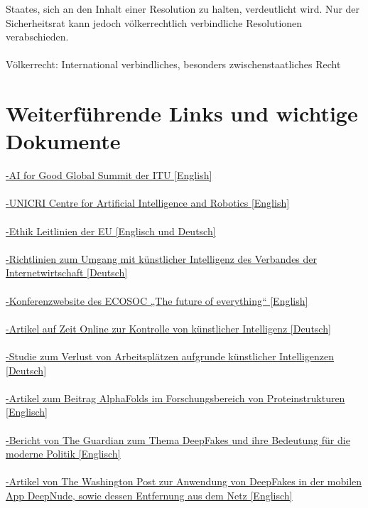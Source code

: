 \documentclass[a4paper,11pt]{article}
\begin{document}
Staates, sich an den Inhalt einer Resolution zu halten, verdeutlicht wird. Nur der Sicherheitsrat kann jedoch völkerrechtlich verbindliche Resolutionen verabschieden. \\ \\ Völkerrecht:  International verbindliches, besonders zwischenstaatliches Recht 

  \section{Weiterführende Links und wichtige Dokumente}
  
\href{https://www.itu.int/en/ITU-T/AI/Pages/201706-default.aspx}{-AI for Good Global Summit der ITU [English]} \\ \\ \href{http://www.unicri.it/in_focus/on/UNICRI_Centre_Artificial_Robotics}{-UNICRI Centre for Artificial Intelligence and Robotics [English]} \\ \\ \href{https://ec.europa.eu/digital-single-market/en/news/ethics-guidelines-trustworthy-ai}{-Ethik Leitlinien der EU [Englisch und Deutsch]} \\ \\ \href{https://www.eco.de/wp-content/uploads/dlm_uploads/2018/09/20180918_eco_LTL-K\%C3\%BCnstliche-Intelligenz.pdf}{-Richtlinien zum Umgang mit künstlicher Intelligenz des Verbandes der Internetwirtschaft [Deutsch]} \\ \\ \href{https://www.un.org/sustainabledevelopment/blog/2017/10/looking-to-future-un-to-consider-how-artificial-intelligence-could-help-achieve-economic-growth-and-reduce-inequalities/}{-Konferenzwebsite des ECOSOC „The future of everything“ [English]} \\ \\ \href{http://www.zeit.de/digital/internet/2017-10/kuenstliche-intelligenz-deepmind-back-box-regulierung}{-Artikel auf Zeit Online zur Kontrolle von künstlicher Intelligenz [Deutsch]} \\ \\ \href{https://www.iotforall.com/impact-of-artificial-intelligence-job-losses}{-Studie zum Verlust von Arbeitsplätzen aufgrunde künstlicher Intelligenzen [Deutsch]} \\ \\ \href{https://www.nature.com/articles/d41586-019-01357-6}{-Artikel zum Beitrag AlphaFolds im Forschungsbereich von Proteinstrukturen [Englisch]} \\ \\ \href{https://www.theguardian.com/technology/ng-interactive/2019/jun/22/the-rise-of-the-deepfake-and-the-threat-to-democracy}{-Bericht von The Guardian zum Thema DeepFakes und ihre Bedeutung für die moderne Politik [Englisch]} \\ \\ \href{https://www.washingtonpost.com/business/2019/06/28/the-world-is-not-yet-ready-deepnude-creator-kills-app-that-uses-ai-fake-naked-images-women/}{-Artikel von The Washington Post zur Anwendung von DeepFakes in der mobilen App DeepNude, sowie dessen Entfernung aus dem Netz [Englisch]} 
\end{document}
